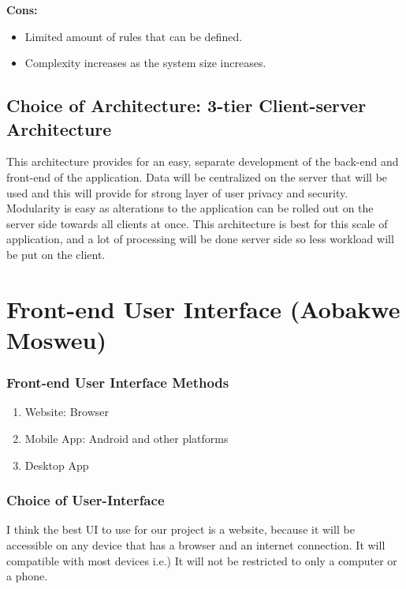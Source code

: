 \documentclass[11pt]{article}
\begin{document}
			\textbf{Cons:}
			\begin{itemize}
				\item Limited amount of rules that can be defined.
				\item Complexity increases as the system size increases.			
			\end{itemize}
		
			
		\subsection{Choice of Architecture: 3-tier Client-server Architecture}
			\begin{flushleft}
				This architecture provides for an easy, separate development of the back-end and front-end of the application. Data will be centralized on the server that will be used and this will provide for strong layer of user privacy and security. Modularity is easy as alterations to the application can be rolled out on the server side towards all clients at once. This architecture is best for this scale of application, and a lot of processing will be done server side so less workload will be put on the client.
			\end{flushleft}
	
	
	\section{Front-end User Interface (Aobakwe Mosweu)}
		\subsubsection{Front-end User Interface Methods}
			\begin{enumerate}
				\item Website: Browser
				\item Mobile App: Android and other platforms
				\item Desktop App
			\end{enumerate}
			
		\subsubsection{Choice of User-Interface}
			\begin{flushleft}
				I think the best UI to use for our project is a website, because it will be accessible on any device that has a browser and an internet connection. It will compatible with most devices i.e.) It will not be restricted to only a computer or a phone.
			\end{flushleft}
\end{document}
